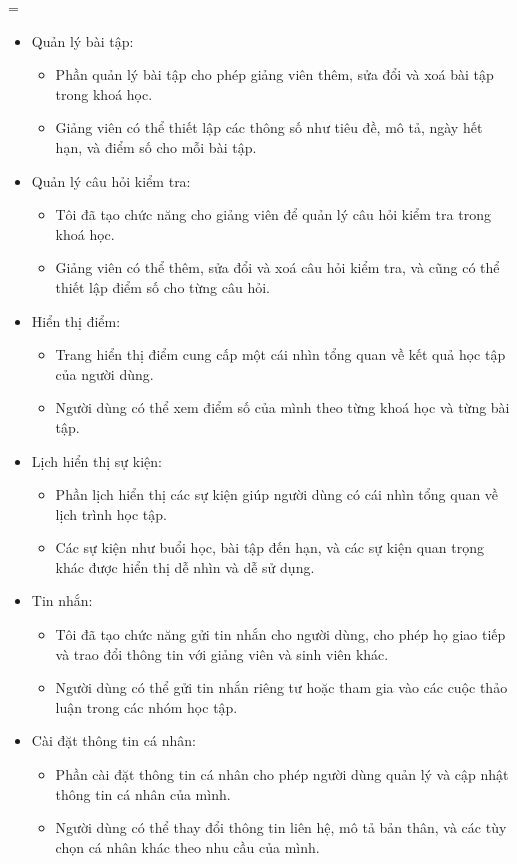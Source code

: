 =\documentclass[../Thesis.tex]{subfiles}
\begin{document}
\begin{itemize}
        \item Quản lý bài tập:
            \begin{itemize}
                \item Phần quản lý bài tập cho phép giảng viên thêm, sửa đổi và xoá bài tập trong khoá học.
                \item Giảng viên có thể thiết lập các thông số như tiêu đề, mô tả, ngày hết hạn, và điểm số cho mỗi bài tập.
            \end{itemize}
        \item Quản lý câu hỏi kiểm tra:
            \begin{itemize}
                \item Tôi đã tạo chức năng cho giảng viên để quản lý câu hỏi kiểm tra trong khoá học.
                \item Giảng viên có thể thêm, sửa đổi và xoá câu hỏi kiểm tra, và cũng có thể thiết lập điểm số cho từng câu hỏi.
            \end{itemize}
        \item Hiển thị điểm:
            \begin{itemize}
                \item Trang hiển thị điểm cung cấp một cái nhìn tổng quan về kết quả học tập của người dùng.
                \item Người dùng có thể xem điểm số của mình theo từng khoá học và từng bài tập.
            \end{itemize}
        \item Lịch hiển thị sự kiện:
            \begin{itemize}
                \item Phần lịch hiển thị các sự kiện giúp người dùng có cái nhìn tổng quan về lịch trình học tập.
                \item Các sự kiện như buổi học, bài tập đến hạn, và các sự kiện quan trọng khác được hiển thị dễ nhìn và dễ sử dụng.
            \end{itemize}
        \item Tin nhắn:
            \begin{itemize}
                \item Tôi đã tạo chức năng gửi tin nhắn cho người dùng, cho phép họ giao tiếp và trao đổi thông tin với giảng viên và sinh viên khác.
                \item Người dùng có thể gửi tin nhắn riêng tư hoặc tham gia vào các cuộc thảo luận trong các nhóm học tập.
            \end{itemize}
        \item Cài đặt thông tin cá nhân:
            \begin{itemize}
                \item Phần cài đặt thông tin cá nhân cho phép người dùng quản lý và cập nhật thông tin cá nhân của mình.
                \item Người dùng có thể thay đổi thông tin liên hệ, mô tả bản thân, và các tùy chọn cá nhân khác theo nhu cầu của mình.
            \end{itemize}
    \end{itemize}
    
\end{document}
